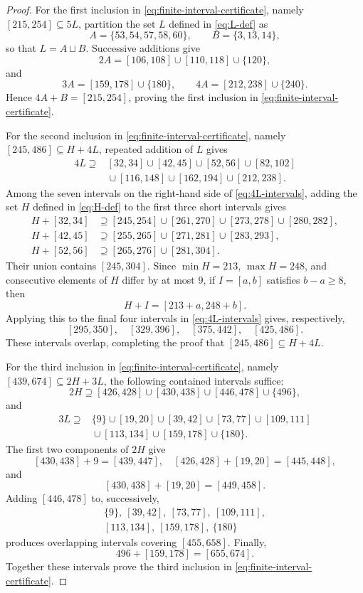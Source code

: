 \documentclass[12pt]{article}
\theoremstyle{plain}
\theoremstyle{definition}
\theoremstyle{plain}
\begin{document}
\begin{proof}
For the first inclusion in
\eqref{eq:finite-interval-certificate}, namely
$[215,254]\subseteq5L$, partition the set $L$ defined in
\eqref{eq:L-def} as
\[
 A=\{53,54,57,58,60\},\qquad B=\{3,13,14\},
\]
so that $L=A\sqcup B$.  Successive additions give
\[
 2A=[106,108]\cup[110,118]\cup\{120\},
\]
and
\[
 3A=[159,178]\cup\{180\},\qquad
 4A=[212,238]\cup\{240\}.
\]
Hence $4A+B=[215,254]$, proving the first inclusion in
\eqref{eq:finite-interval-certificate}.

For the second inclusion in
\eqref{eq:finite-interval-certificate}, namely
$[245,486]\subseteq H+4L$, repeated addition of $L$ gives
\begin{equation}\label{eq:4L-intervals}
\begin{split}
4L\supseteq{}&[32,34]\cup[42,45]\cup[52,56]\cup[82,102]\\
 &{}\cup[116,148]\cup[162,194]\cup[212,238].
\end{split}
\end{equation}
Among the seven intervals on the right-hand side of
\eqref{eq:4L-intervals}, adding the set $H$ defined in
\eqref{eq:H-def} to the first three short intervals gives
\[
\begin{aligned}
H+[32,34]&\supseteq[245,254]\cup[261,270]
 \cup[273,278]\cup[280,282],\\
H+[42,45]&\supseteq[255,265]\cup[271,281]\cup[283,293],\\
H+[52,56]&\supseteq[265,276]\cup[281,304].
\end{aligned}
\]
Their union contains $[245,304]$.  Since $\min H=213$,
$\max H=248$, and consecutive elements of $H$ differ by at most $9$,
if $I=[a,b]$ satisfies $b-a\geq8$, then
\[
 H+I=[213+a,248+b].
\]
Applying this to the final four intervals in
\eqref{eq:4L-intervals} gives, respectively,
\[
 [295,350],\quad[329,396],\quad[375,442],\quad[425,486].
\]
These intervals overlap, completing the proof that
$[245,486]\subseteq H+4L$.

For the third inclusion in
\eqref{eq:finite-interval-certificate}, namely
$[439,674]\subseteq2H+3L$, the following contained intervals suffice:
\[
 2H\supseteq[426,428]\cup[430,438]\cup[446,478]\cup\{496\},
\]
and
\[
\begin{split}
3L\supseteq{}&\{9\}\cup[19,20]\cup[39,42]\cup[73,77]
 \cup[109,111]\\
 &{}\cup[113,134]\cup[159,178]\cup\{180\}.
\end{split}
\]
The first two components of $2H$ give
\[
 [430,438]+9=[439,447],\quad
 [426,428]+[19,20]=[445,448],
\]
and
\[
 [430,438]+[19,20]=[449,458].
\]
Adding $[446,478]$ to, successively,
\[
\begin{gathered}
 \{9\},\ [39,42],\ [73,77],\ [109,111],\\
 [113,134],\ [159,178],\ \{180\}
\end{gathered}
\]
produces overlapping intervals covering $[455,658]$.  Finally,
\[
 496+[159,178]=[655,674].
\]
Together these intervals prove the third inclusion in
\eqref{eq:finite-interval-certificate}.


\end{proof}
\end{document}
